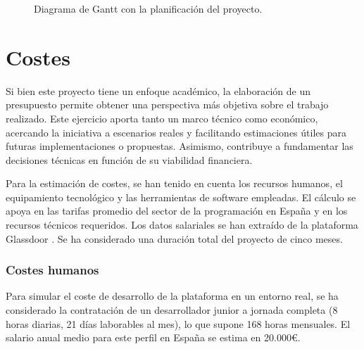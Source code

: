 \begin{figure}[H]
    \centering
    \caption{Diagrama de Gantt con la planificación del proyecto.}
\end{figure}

\section{Costes}

Si bien este proyecto tiene un enfoque académico, la elaboración de un presupuesto permite obtener una perspectiva más objetiva sobre el trabajo realizado. Este ejercicio aporta tanto un marco técnico como económico, acercando la iniciativa a escenarios reales y facilitando estimaciones útiles para futuras implementaciones o propuestas. Asimismo, contribuye a fundamentar las decisiones técnicas en función de su viabilidad financiera.

Para la estimación de costes, se han tenido en cuenta los recursos humanos, el equipamiento tecnológico y las herramientas de software empleadas. El cálculo se apoya en las tarifas promedio del sector de la programación en España y en los recursos técnicos requeridos. Los datos salariales se han extraído de la plataforma Glassdoor \cite{glassdoor}. Se ha considerado una duración total del proyecto de cinco meses.

\subsubsection{Costes humanos}

Para simular el coste de desarrollo de la plataforma en un entorno real, se ha considerado la contratación de un desarrollador junior a jornada completa (8 horas diarias, 21 días laborables al mes), lo que supone 168 horas mensuales. El salario anual medio para este perfil en España se estima en 20.000€.


